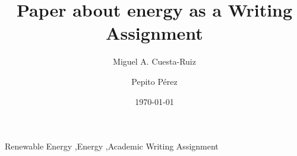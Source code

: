 \documentclass[preprint,12pt]{elsarticle}
\date{\today}
\begin{document}
\begin{frontmatter}

\title{Paper about energy as a Writing Assignment}

\author[label1,label2]{Miguel A. Cuesta-Ruiz}
\author[label1]{Pepito P\'erez}
\address[label1]{DeustoTech - Fundaci\'on Deusto, Avda Universidades, 24, 48007, Bilbao. }
\address[label2]{Facultad Ingenier\'\i{}a, Universidad de Deusto, Avda. Universidades, 24, 48007, Bilbao.}


\begin{keyword}
Renewable Energy \sep Energy \sep Academic Writing Assignment
\end{keyword}

\end{frontmatter}





\end{document}
